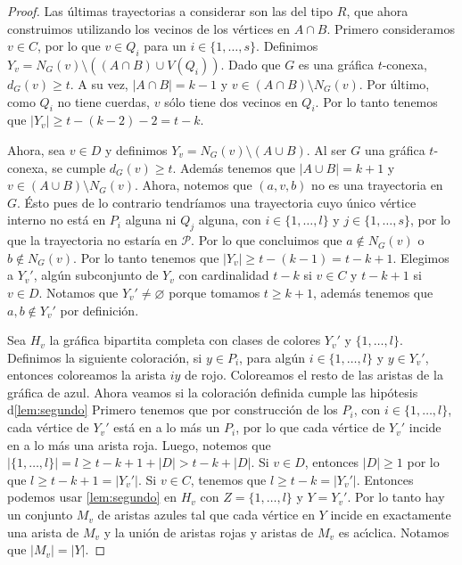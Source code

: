 \begin{proof}
    Las \'ultimas trayectorias a considerar son las del tipo $R$, que ahora
    construimos utilizando los vecinos de los v\'ertices en $A \cap B$. Primero
    consideramos $v \in C$, por lo que $v \in Q_i$ para un  $i \in \{1, \dots,
    s\}$. Definimos $Y_v = N_G(v) \setminus ((A \cap B) \cup V(Q_i))$. Dado que
    $G$ es una gr\'afica $t$-conexa, $d_G(v) \geq t$. A su vez, $|A \cap B| =k
    -1$ y $v \in (A \cap B) \setminus N_G(v)$. Por \'ultimo, como $Q_i$ no tiene
    cuerdas, $v$ s\'olo tiene dos vecinos en $Q_i$. Por lo tanto tenemos que
    $|Y_v| \geq t- (k-2)-2 = t-k$. 
    
    Ahora, sea $v \in D$ y definimos $Y_v = N_G(v) \setminus (A \cup B)$. Al ser
    $G$ una gr\'afica $t$-conexa, se cumple $d_G(v) \geq t$. Adem\'as tenemos
    que $|A \cup B| = k + 1$ y $v \in (A \cup B) \setminus N_G(v)$. Ahora,
    notemos que $(a, v, b)$ no es una trayectoria en $G$. \'Esto pues de lo
    contrario tendr\'i{}amos una trayectoria cuyo \'unico v\'ertice interno no
    est\'a en $P_i$ alguna ni $Q_j$ alguna, con $i \in \{1, \dots, l\}$ y $j \in
    \{1, \dots, s\}$, por lo que la trayectoria no estar\'i{}a en $\mathcal{P}$.
    Por lo que concluimos que $a \notin N_G(v)$ o $b \notin N_G(v)$. Por lo
    tanto tenemos que $|Y_v| \geq t- (k-1) = t-k + 1$. Elegimos a $Y_v '$,
    alg\'un subconjunto de $Y_v$ con cardinalidad $t-k$ si $v \in C$ y $t- k+ 1$
    si $v \in D$. Notamos que $Y_v ' \neq \varnothing$ porque tomamos $t \geq k
    + 1$, adem\'as tenemos que $a, b \notin Y_v '$ por definici\'on. 

    Sea $H_v$ la gr\'afica bipartita completa con clases de colores $Y_v '$ y
    $\{1,\dots, l\}$. Definimos la siguiente coloraci\'on, si $y \in P_i$, para
    alg\'un $i \in \{1, \dots, l\}$ y $y \in Y_v '$, entonces coloreamos la
    arista $iy$ de rojo. Coloreamos el resto de las aristas de la gr\'afica de
    azul. Ahora veamos si la coloraci\'on definida cumple las hip\'otesis
    d\cref{lem:segundo} Primero tenemos que por construcci\'on de los $P_i$, con
    $i \in \{1, \dots, l\}$, cada v\'ertice de $Y_v '$ est\'a en a lo m\'as un
    $P_i$, por lo que cada v\'ertice de $Y_v '$ incide en a lo m\'as una arista
    roja. Luego, notemos que $|\{1, \dots, l\}| = l  \geq t-k+ 1+ |D| > t-k +
    |D|$. Si $v \in D$, entonces $|D| \geq 1$ por lo que $l \geq t- k+1 = |Y_v
    '|$. Si $v \in C$, tenemos que $l \geq t-k = |Y_v '|$. Entonces podemos usar
    \cref{lem:segundo} en $H_v$ con $Z= \{1, \dots, l\}$ y $Y = Y_v '$. Por lo
    tanto hay un conjunto $M_v$ de aristas azules tal que cada v\'ertice en $Y$
    incide en exactamente una arista de $M_v$ y la uni\'on de aristas rojas y
    aristas de $M_v$ es ac\'\i{}clica. Notamos que $|M_v|=|Y|$.


\end{proof}
